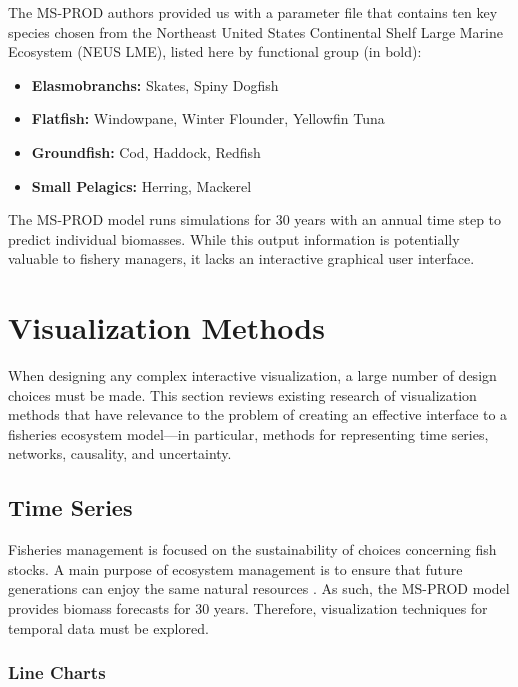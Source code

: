 The MS-PROD authors provided us with a parameter file that contains ten key species chosen from the Northeast United States Continental Shelf Large Marine Ecosystem (NEUS LME), listed here by functional group (in bold):
\begin{itemize}
	\item \textbf{Elasmobranchs:} Skates, Spiny Dogfish
	\item \textbf{Flatfish:} Windowpane, Winter Flounder, Yellowfin Tuna
	\item \textbf{Groundfish:} Cod, Haddock, Redfish
	\item \textbf{Small Pelagics:} 	Herring, Mackerel
\end{itemize}
The MS-PROD model runs simulations for 30 years with an annual time step to predict individual biomasses.  While this output information is potentially valuable to fishery managers, it lacks an interactive graphical user interface.  

\section{Visualization Methods}

When designing any complex interactive visualization, a large number of design choices must be made.  This section reviews existing research of visualization methods that have relevance to the problem of creating an effective interface to a fisheries ecosystem model---in particular, methods for representing time series, networks, causality, and uncertainty.

\subsection{Time Series}

Fisheries management is focused on the sustainability of choices concerning fish stocks.  A main purpose of ecosystem management is to ensure that future generations can enjoy the same natural resources \cite{christensen1996}.  As such, the MS-PROD model provides biomass forecasts for 30 years.  Therefore, visualization techniques for temporal data must be explored.

\subsubsection{Line Charts}


